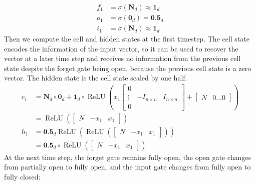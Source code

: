 \documentclass{article}
\DeclareMathOperator{\ReLU}{ReLU}
\begin{document}
%
\begin{align*}
  f_1 &= \sigma(\textbf{N}_d) \approx \textbf{1}_d \\
  o_1 &= \sigma(\textbf{0}_d) = \textbf{0.5}_d \\
  i_1 &=  \sigma(\textbf{N}_d) \approx \textbf{1}_d
\end{align*}
%
Then we compute the cell and hidden states at the first timestep. The cell state encodes the information of the input vector, so it can be used to recover the vector at a later time step and receives no information from the previous cell state despite the forget gate being open, because the previous cell state is a zero vector. The hidden state is the cell state scaled by one half.
%
\begin{align*}
  c_1 &= \textbf{N}_d\circ \textbf{0}_d+  \textbf{1}_d \circ \ReLU\left(x_1\begin{bmatrix} 0 &  & \\ \vdots & -I_{n \times n} & I_{n \times n}\\ 0 & &  \end{bmatrix} + \begin{bmatrix} N & 0 \dots 0\end{bmatrix}\right) \\
      & = \ReLU\left( \begin{bmatrix} N & -x_1 & x_1 \end{bmatrix}\right) \\[1ex]
  h_1 &= \textbf{0.5}_d\ReLU \left(\ReLU( \begin{bmatrix} N & -x_1 & x_1 \end{bmatrix})\right) \\
      &= \textbf{0.5}_d\circ \ReLU( \begin{bmatrix} N & -x_1 & x_1 \end{bmatrix})
\end{align*}
%
At the next time step, the forget gate remains fully open, the open gate changes from partially open to fully open, and the input gate changes from fully open to fully closed:
%
\end{document}
